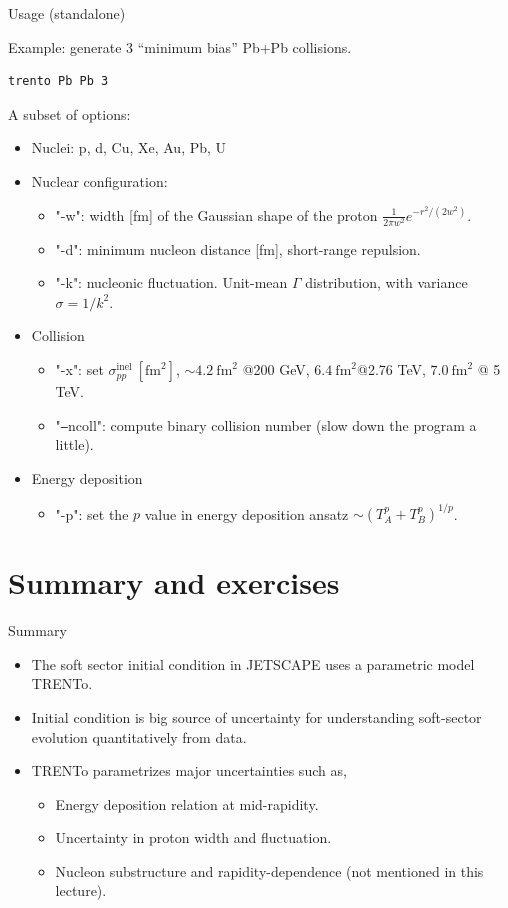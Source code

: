 \documentclass[11pt, aspectratio=169]{beamer}
\begin{document}
\begin{frame}[fragile]{Usage (standalone)}

Example: generate 3 ``minimum bias'' Pb+Pb collisions.
\begin{lstlisting}[language=bash]
trento Pb Pb 3
\end{lstlisting}
A subset of options:
\begin{itemize}
\item Nuclei: p, d, Cu, Xe, Au, Pb, U
\item Nuclear configuration:
\begin{itemize}
\item "-w": width [fm] of the Gaussian shape of the proton $\frac{1}{2\pi w^2}e^{-r^2/(2w^2)}$.
\item "-d": minimum nucleon distance [fm], short-range repulsion.
\item "-k": nucleonic fluctuation. Unit-mean $\Gamma$ distribution, with variance $\sigma=1/k^2$.
\end{itemize}
\item Collision
\begin{itemize}
\item "-x": set $\sigma_{pp}^{\textrm{inel}}~[\mathrm{fm}^2]$, $\sim 4.2~\mathrm{fm}^2$ @200 GeV, $6.4~\mathrm{fm}^2$@2.76 TeV, $7.0~\mathrm{fm}^2$ @ 5 TeV.
\item "{\tt--}ncoll": compute binary collision number (slow down the program a little).
\end{itemize}
\item Energy deposition
\begin{itemize}
\item "-p": set the $p$ value in energy deposition ansatz $\sim (T_A^p+T_B^p)^{1/p}$.
\end{itemize}
\end{itemize}

\end{frame}

\section{Summary and exercises }
\begin{frame}{Summary}
\begin{itemize}
\item The soft sector initial condition in JETSCAPE uses a parametric model TRENTo.
\item Initial condition is big source of uncertainty for understanding soft-sector evolution quantitatively from data.
\item TRENTo parametrizes major uncertainties such as,
\begin{itemize}
\item Energy deposition relation at mid-rapidity.
\item Uncertainty in proton width and fluctuation.
\item Nucleon substructure and rapidity-dependence (not mentioned in this lecture).
\end{itemize}
\end{itemize}

\end{frame}
\end{document}

